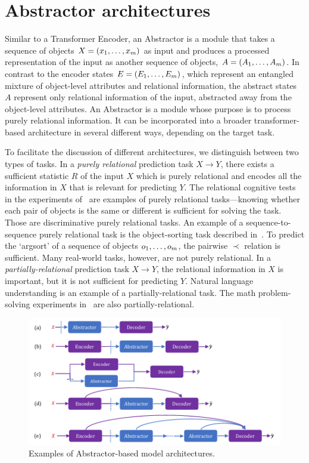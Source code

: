 \section{Abstractor architectures}\label{sec:abstractor_architectures}

Similar to a Transformer Encoder, an Abstractor is a module that takes a sequence of objects $X = (x_1, \ldots, x_m)$ as input and produces a processed representation of the input as another sequence of objects, $A = (A_1, \ldots, A_m)$. In contrast to the encoder states $E = \left(E_1, \ldots, E_m\right)$, which represent an entangled mixture of object-level attributes and relational information, the abstract states $A$ represent only relational information of the input, abstracted away from the object-level attributes. An Abstractor is a module whose purpose is to process purely relational information. It can be incorporated into a broader transformer-based architecture in several different ways, depending on the target task.

To facilitate the discussion of different architectures, we distinguish between two types of tasks. In a \textit{purely relational} prediction task $X \to Y$, there exists a sufficient statistic $R$ of the input $X$ which is purely relational and encodes all the information in $X$ that is relevant for predicting $Y$. The relational cognitive tests in the experiments of~\citep{esbn,kerg2022neural} are examples of purely relational tasks---knowing whether each pair of objects is the same or different is sufficient for solving the task. Those are discriminative purely relational tasks. An example of a sequence-to-sequence purely relational task is the object-sorting task described in~. To predict the `argsort' of a sequence of objects $o_1, \ldots, o_m$, the pairwise $\prec$ relation is sufficient. Many real-world tasks, however, are not purely relational. In a \textit{partially-relational} prediction task $X \to Y$, the relational information in $X$ is important, but it is not sufficient for predicting $Y$. Natural language understanding is an example of a partially-relational task. The math problem-solving experiments in~ are also partially-relational.

\begin{figure}
    \centering
    \includegraphics[width=.8\textwidth]{figures/abstractor_architectures.pdf}
    \caption{Examples of Abstractor-based model architectures.}
    \label{fig:abstractor_architectures}
\end{figure}


